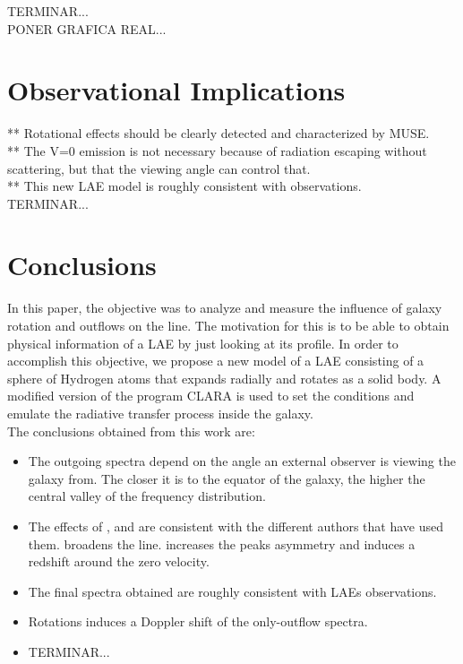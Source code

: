 \documentclass[twocolappendix]{latex/emulateapj}
\begin{document}
TERMINAR...\\
PONER GRAFICA REAL...\\

\section{Observational Implications}
\label{sec:observationalimplications}

** Rotational effects should be clearly detected and characterized by MUSE.\\

** The V=0 emission is not necessary because of radiation escaping without scattering, but that the viewing angle can control that. \\

** This new LAE model is roughly consistent with observations.\\

TERMINAR...\\


\section{Conclusions}
\label{sec:conclusions}

In this paper, the objective was to analyze and measure the influence of galaxy rotation and outflows on the \lya line. The motivation for this is to be able to obtain physical information of a LAE by just looking at its \lya profile. In order to accomplish this objective, we propose a new model of a LAE consisting of a sphere of Hydrogen atoms that expands radially and rotates as a solid body. A modified version of the program CLARA \cite{CLARA} is used to set the conditions and emulate the radiative transfer process inside the galaxy. \\

The conclusions obtained from this work are: \\

\begin{itemize}
	\item The outgoing spectra depend on the angle an external observer is viewing the galaxy from. The closer it is to the equator of the galaxy, the higher the central valley of the frequency distribution. \\
	
	\item The effects of \vrot, \vout and \tauh are consistent with the different authors that have used them. \vrot broadens the \lya line. \vout increases the peaks asymmetry and \tauh induces a redshift around the zero velocity.\\
	
	\item The final spectra obtained are roughly consistent with LAEs observations.  \\
	
	\item Rotations induces a Doppler shift of the only-outflow spectra.\\
	
	\item TERMINAR...\\
\end{itemize}
\end{document}
